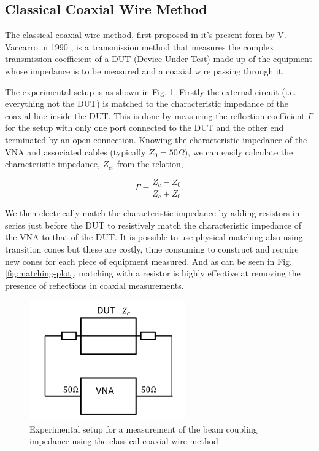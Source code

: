 \subsection{Classical Coaxial Wire Method}

The classical coaxial wire method, first proposed in it's present form by V. Vaccarro in 1990 \cite{Vaccaro:ImprovedWireMeth}, is a transmission method that measures the complex transmission coefficient of a DUT (Device Under Test) made up of the equipment whose impedance is to be measured and a coaxial wire passing through it. 

The experimental setup is as shown in Fig. \ref{fig:classic-coax}. Firstly the external circuit (i.e. everything not the DUT) is matched to the characteristic impedance of the coaxial line inside the DUT. This is done by measuring the reflection coefficient $\Gamma$ for the setup with only one port connected to the DUT and the other end terminated by an open connection. Knowing the characteristic impedance of the VNA and associated cables (typically $Z_{0} = 50\Omega$), we can easily calculate the characteristic impedance, $Z_{c}$, from the relation,

\begin{equation}
\Gamma = \frac{Z_{c} - Z_{0}}{Z_{c} + Z_{0}}.
\end{equation}

We then electrically match the characteristic impedance by adding resistors in series just before the DUT to resistively match the characteristic impedance of the VNA to that of the DUT. It is possible to use physical matching also using transition cones but these are costly, time consuming to construct and require new cones for each piece of equipment measured. And as can be seen in Fig. \ref{fig:matching-plot}, matching with a resistor is highly effective at removing the presence of reflections in coaxial measurements.

\begin{figure}
\begin{center}
\includegraphics[width=0.6\textwidth]{Bench_Top_Measurements/figures/wire_meas_single_wire.pdf}
\end{center}
\caption{Experimental setup for a measurement of the beam coupling impedance using the classical coaxial wire method}
\label{fig:classic-coax}
\end{figure} 

